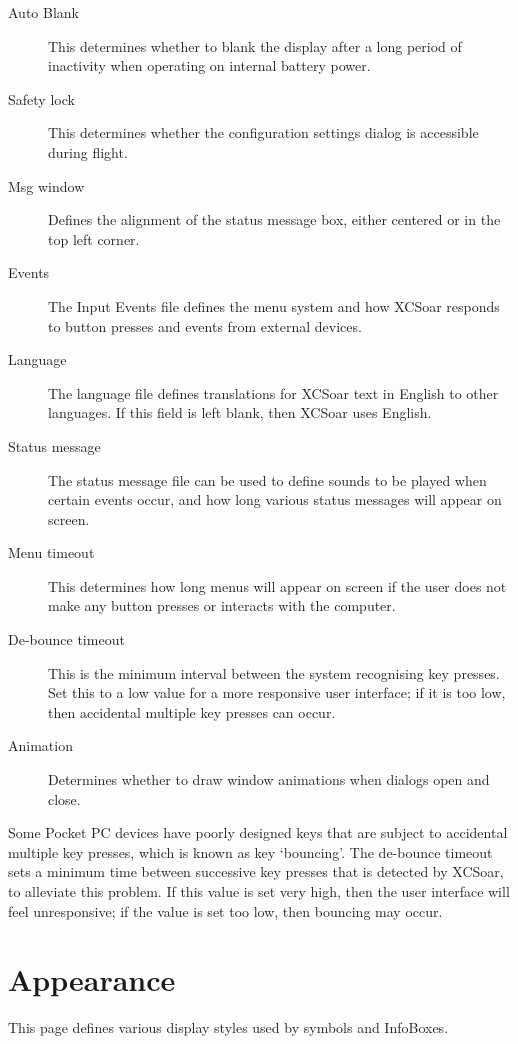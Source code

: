 \documentclass[a4paper,12pt]{refrep}
\begin{document}
\begin{description}
\item[Auto Blank] This determines whether to blank the display after a long period of inactivity when operating on internal battery power.
\item[Safety lock]
This determines whether the configuration settings dialog is
accessible during flight.
\item[Msg window] Defines the alignment of the status message box, either centered or in the top left corner.
\item[Events]
The Input Events file defines the menu system and how XCSoar responds
to button presses and events from external devices.
\item[Language]
The language file defines translations for XCSoar text in English to
other languages.  If this field is left blank, then XCSoar uses
English.
\item[Status message]
The status message file can be used to define sounds to be played when certain
events occur, and how long various status messages will appear on screen.
\item[Menu timeout]
This determines how long menus will appear on screen if the user
does not make any button presses or interacts with the computer.
\item[De-bounce timeout]
This is the minimum interval between the system recognising key presses. 
Set this to a low value for a more responsive user interface; if
it is too low, then accidental multiple key presses can occur.
\item[Animation] Determines whether to draw window animations when dialogs open and close.
\end{description}

Some Pocket PC devices have poorly designed keys that are subject to
accidental multiple key presses, which is known as key `bouncing'.  The
de-bounce timeout sets a minimum time between successive key presses
that is detected by XCSoar, to alleviate this problem.  If this value
is set very high, then the user interface will feel unresponsive; if
the value is set too low, then bouncing may occur.

\clearpage
\section{Appearance}

This page defines various display styles used by symbols and InfoBoxes.
\end{document}
